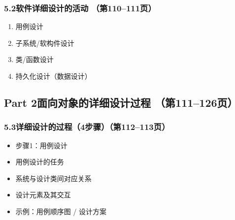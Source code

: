 \documentclass[12pt,a4paper]{ctexart}
\begin{document}
\subsubsection{5.2\quad 软件详细设计的活动 \hfill（第110--111页）}
\begin{enumerate}
    \item 用例设计
    \item 子系统/软构件设计
    \item 类/函数设计
    \item 持久化设计（数据设计）
\end{enumerate}

\subsection{Part 2\quad 面向对象的详细设计过程 \hfill（第111--126页）}

\subsubsection{5.3\quad 详细设计的过程（4步骤）\hfill（第112--113页）}
\begin{itemize}
    \item 步骤1：用例设计
    \item 用例设计的任务
    \item 系统与设计类间对应关系
    \item 设计元素及其交互
    \item 示例：用例顺序图 / 设计方案
\end{itemize}
\end{document}
